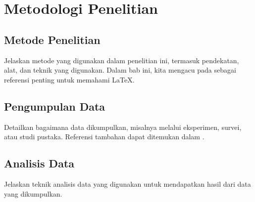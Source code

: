 \chapter{Metodologi Penelitian}
\section{Metode Penelitian}
Jelaskan metode yang digunakan dalam penelitian ini, termasuk pendekatan, alat, dan teknik yang digunakan.
Dalam bab ini, kita mengacu pada \cite{latexcompanion} sebagai referensi penting untuk memahami LaTeX.

\section{Pengumpulan Data}
Detailkan bagaimana data dikumpulkan, misalnya melalui eksperimen, survei, atau studi pustaka.
Referensi tambahan dapat ditemukan dalam \cite{lamport94}.

\section{Analisis Data}
Jelaskan teknik analisis data yang digunakan untuk mendapatkan hasil dari data yang dikumpulkan.
